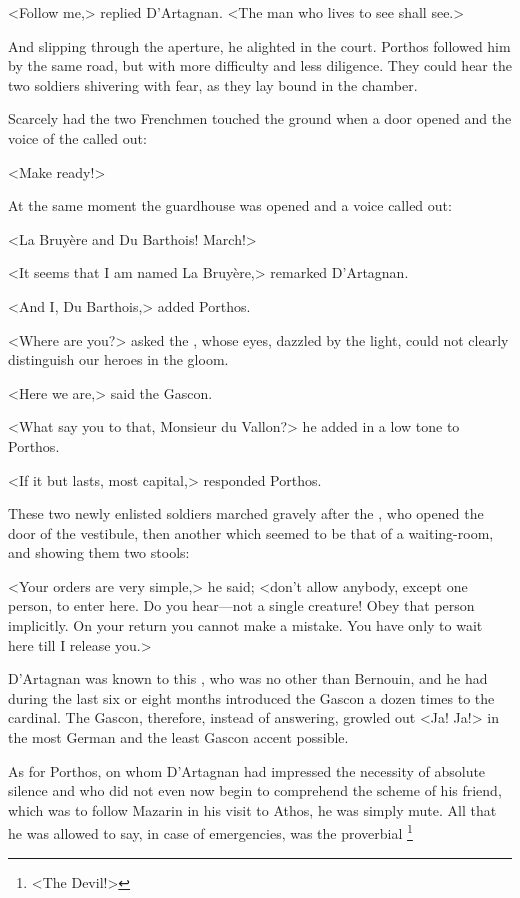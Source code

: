 <Follow me,> replied D'Artagnan. <The man who lives to see shall see.>

And slipping through the aperture, he alighted in the court. Porthos followed him by the same road, but with more difficulty and less diligence. They could hear the two soldiers shivering with fear, as they lay bound in the chamber.

Scarcely had the two Frenchmen touched the ground when a door opened and the voice of the  called out:

<Make ready!>

At the same moment the guardhouse was opened and a voice called out:

<La Bruyère and Du Barthois! March!>

<It seems that I am named La Bruyère,> remarked D'Artagnan.

<And I, Du Barthois,> added Porthos.

<Where are you?> asked the , whose eyes, dazzled by the light, could not clearly distinguish our heroes in the gloom.

<Here we are,> said the Gascon.

<What say you to that, Monsieur du Vallon?> he added in a low tone to Porthos.

<If it but lasts, most capital,> responded Porthos.

These two newly enlisted soldiers marched gravely after the , who opened the door of the vestibule, then another which seemed to be that of a waiting-room, and showing them two stools:

<Your orders are very simple,> he said; <don't allow anybody, except one person, to enter here. Do you hear—not a single creature! Obey that person implicitly. On your return you cannot make a mistake. You have only to wait here till I release you.>

D'Artagnan was known to this , who was no other than Bernouin, and he had during the last six or eight months introduced the Gascon a dozen times to the cardinal. The Gascon, therefore, instead of answering, growled out <Ja! Ja!> in the most German and the least Gascon accent possible.

As for Porthos, on whom D'Artagnan had impressed the necessity of absolute silence and who did not even now begin to comprehend the scheme of his friend, which was to follow Mazarin in his visit to Athos, he was simply mute. All that he was allowed to say, in case of emergencies, was the proverbial \footnote{<The Devil!>}

